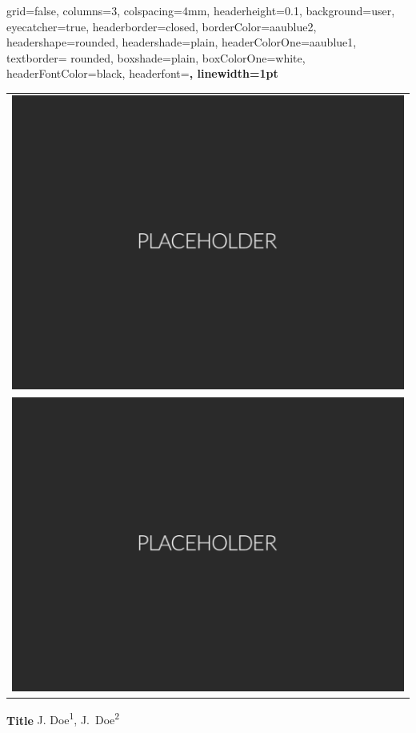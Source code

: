 \documentclass[a0paper,portrait]{style/baposter}
\newcommand{\me}{J. Doe}
\newcommand{\postertitle}{Title}
\begin{document}


\begin{poster}{
  grid=false,
  columns=3,
  colspacing=4mm,
  headerheight=0.1\textheight,
  background=user,
  eyecatcher=true,
  headerborder=closed,
  borderColor=aaublue2,
  headershape=rounded,
  headershade=plain,
  headerColorOne=aaublue1,
  textborder= rounded,
  boxshade=plain,
  boxColorOne=white,
  headerFontColor=black,
  headerfont=\Large\sf\bf,
  linewidth=1pt
}
{
  \begin{tabular}{c}
  \includegraphics[height=0.4\headerheight]{fig/placeholder.pdf} \\
  \includegraphics[height=0.4\headerheight]{fig/placeholder.pdf}
  \end{tabular}
}
{
\bf\LARGE{\postertitle}
}
%
{\vspace{0.6em}
  \large{\me\textsuperscript{1}, J.~Doe\textsuperscript{2}} \\[0.4em]

}
\end{poster}
\end{document}
